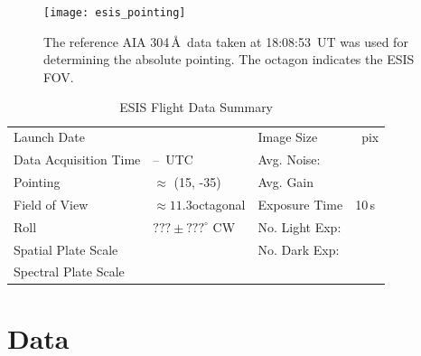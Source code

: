 		
		
		\begin{figure}[ht]
			\begin{center}
				\texttt{[image: esis\_pointing]}
				\caption{The reference AIA 304\,\AA\ data taken at 18:08:53~UT was used for determining the absolute pointing. The octagon indicates the ESIS FOV.}
				\label{fig:fov}
			\end{center}
		\end{figure}
	

		\begin{table}
		\begin{center}
			\caption{ESIS Flight Data Summary}
			\label{tab:data_info}
			\begin{tabular}{ll|ll}\hline
				Launch Date & \dateMission & Image Size  & \imageShape~pix\\
				Data Acquisition Time & \timeDataStart--\timeDataStop~UTC & Avg. Noise: & \readoutNoise\\
			    Pointing   &  $\approx$ (15\arcsec, -35\arcsec) & Avg. Gain &   \gain \\
				Field of View  & $\approx 11.3$\arcmin octagonal  & Exposure Time & 10\,s \\
				Roll & $??? \pm ???^\circ$ CW & No. Light Exp: &\numDataFrames\\
			    Spatial  Plate Scale  &  \plateScale & No. Dark Exp: &\numDarkFrames \\
				Spectral  Plate Scale  &  \dispersion & \\
					\hline
			\end{tabular}
		\end{center}
		\end{table}
		
		



	
\section{Data} 

